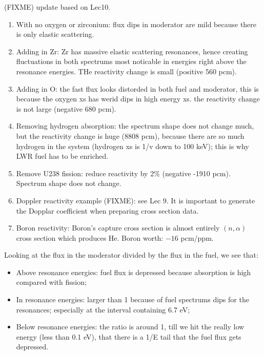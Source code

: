 \documentclass{school-22.211-notes}
\date{March  7, 2012}
\begin{document}
\maketitle

\clearpage
{}
(FIXME) update based on Lec10. 
\begin{enumerate}
\item With no oxygen or zirconium: flux dips in moderator are mild because there is only elastic scattering. 
\item Adding in Zr: Zr has massive elastic scattering resonances, hence creating fluctuations in both spectrums most noticable in energies right above the resonance energies. THe reactivity change is small (positive 560 pcm).
\item Adding in O: the fast flux looks distorded in both fuel and moderator, this is because the oxygen xs has werid dips in high energy xs. the reactivity change is not large (negative 680 pcm). 
\item Removing hydrogen absorption: the spectrum shape does not change much, but the reactivity change is huge (8808 pcm), because there are so much hydrogen in the system (hydrogen xs is 1/v down to 100 keV); this is why LWR fuel has to be enriched. 
\item Remove U238 fission: reduce reactivity by 2\% (negative -1910 pcm). Spectrum shape does not change. 
\item Doppler reactivity example (FIXME): see Lec 9. It is important to generate the Dopplar coefficient when preparing cross section data. 
\item Boron reactivity: Boron's capture cross section is almost entirely $(n,\alpha)$ cross section which produces He. Boron worth: $-16$ pcm/ppm. 
\end{enumerate}

Looking at the flux in the moderator divided by the flux in the fuel, we see that:
\begin{itemize}
\item Above resonance energies: fuel flux is depressed because absorption is high compared with fission; 
\item In resonance energies: larger than 1 because of fuel spectrums dips for the resonances; especially at the interval containing 6.7 eV;
\item Below resonance energies: the ratio is around 1, till we hit the really low energy (less than 0.1 eV), that there is a 1/E tail that the fuel flux gets depressed. 
\end{itemize}
\end{document}
